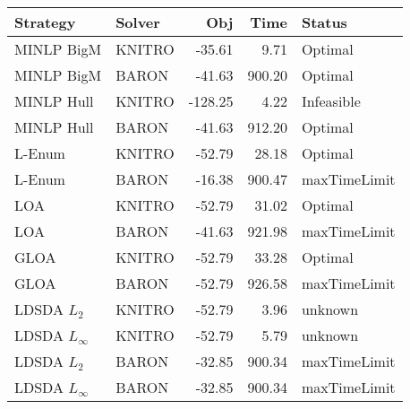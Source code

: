 \begin{tabular}{llrrl}
\toprule
Strategy & Solver & Obj & Time & Status \\
\midrule
MINLP BigM & KNITRO & -35.61 & 9.71 & Optimal \\
MINLP BigM & BARON & -41.63 & 900.20 & Optimal \\
MINLP Hull & KNITRO & -128.25 & 4.22 & Infeasible \\
MINLP Hull & BARON & -41.63 & 912.20 & Optimal \\
L-Enum & KNITRO & -52.79 & 28.18 & Optimal \\
L-Enum & BARON & -16.38 & 900.47 & maxTimeLimit \\
LOA & KNITRO & -52.79 & 31.02 & Optimal \\
LOA & BARON & -41.63 & 921.98 & maxTimeLimit \\
GLOA & KNITRO & -52.79 & 33.28 & Optimal \\
GLOA & BARON & -52.79 & 926.58 & maxTimeLimit \\
LDSDA $L_2$ & KNITRO & -52.79 & 3.96 & unknown \\
LDSDA $L_\infty$ & KNITRO & -52.79 & 5.79 & unknown \\
LDSDA $L_2$ & BARON & -32.85 & 900.34 & maxTimeLimit \\
LDSDA $L_\infty$ & BARON & -32.85 & 900.34 & maxTimeLimit \\
\bottomrule
\end{tabular}
